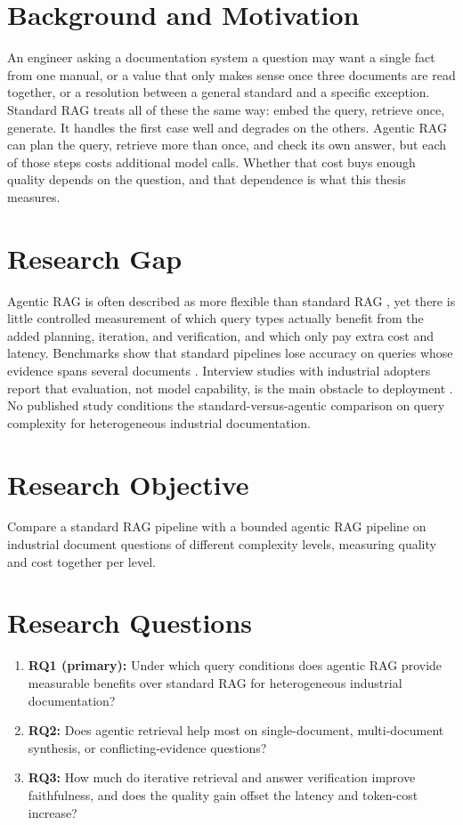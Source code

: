 \documentclass[10pt,a4paper]{article}
\begin{document}
\section{Background and Motivation}

An engineer asking a documentation system a question may want a single fact from one manual, or a value that only makes sense once three documents are read together, or a resolution between a general standard and a specific exception. Standard RAG treats all of these the same way: embed the query, retrieve once, generate. It handles the first case well and degrades on the others. Agentic RAG can plan the query, retrieve more than once, and check its own answer, but each of those steps costs additional model calls. Whether that cost buys enough quality depends on the question, and that dependence is what this thesis measures.

\section{Research Gap}

Agentic RAG is often described as more flexible than standard RAG \cite{singh2025agentic}, yet there is little controlled measurement of which query types actually benefit from the added planning, iteration, and verification, and which only pay extra cost and latency. Benchmarks show that standard pipelines lose accuracy on queries whose evidence spans several documents \cite{tang2024}. Interview studies with industrial adopters report that evaluation, not model capability, is the main obstacle to deployment \cite{ragindustry2025}. No published study conditions the standard-versus-agentic comparison on query complexity for heterogeneous industrial documentation.

\section{Research Objective}

Compare a standard RAG pipeline with a bounded agentic RAG pipeline on industrial document questions of different complexity levels, measuring quality and cost together per level.

\section{Research Questions}

\begin{enumerate}
    \item \textbf{RQ1 (primary):} Under which query conditions does agentic RAG provide measurable benefits over standard RAG for heterogeneous industrial documentation?
    \item \textbf{RQ2:} Does agentic retrieval help most on single-document, multi-document synthesis, or conflicting-evidence questions?
    \item \textbf{RQ3:} How much do iterative retrieval and answer verification improve faithfulness, and does the quality gain offset the latency and token-cost increase?
\end{enumerate}
\end{document}
